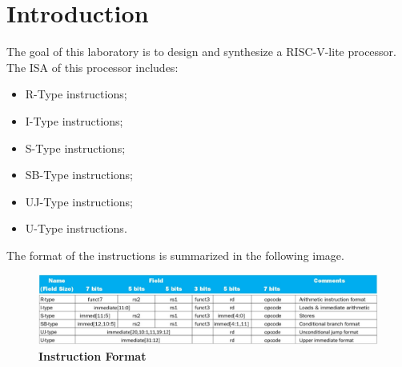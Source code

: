 %
\chapter{Introduction}
\label{chap1}
The goal of this laboratory is to design and synthesize a RISC-V-lite processor. 
The ISA of this processor includes:
\begin{itemize}
    \item R-Type instructions;
    \item I-Type instructions;
    \item S-Type instructions;
    \item SB-Type instructions;
    \item UJ-Type instructions;
    \item U-Type instructions.
\end{itemize}

The format of the instructions is summarized in the following image.
\begin{figure}[!h]
\centering
    \includegraphics[width=\linewidth]{chapters/chap1images/Immagine 2022-02-14 214305.jpg}
    \caption{\textbf{Instruction Format}}
\end{figure}

